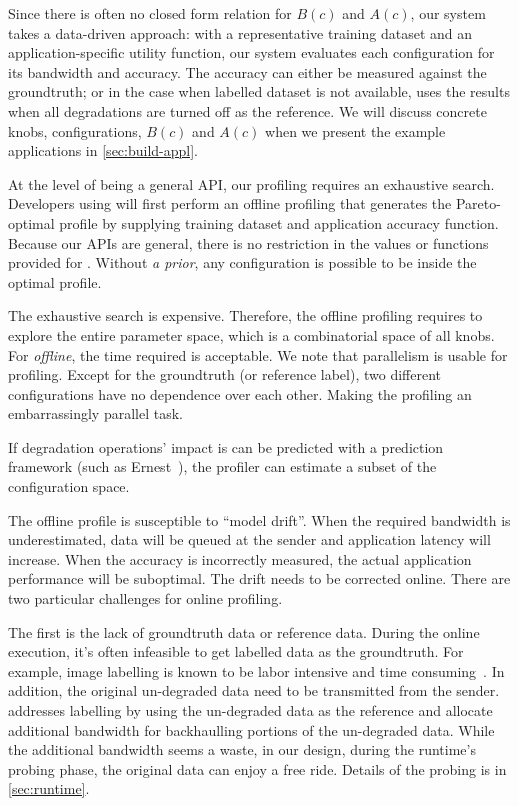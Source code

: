 Since there is often no closed form relation for $B(c)$ and $A(c)$, our system
takes a data-driven approach: with a representative training dataset and an
application-specific utility function, our system evaluates each configuration
for its bandwidth and accuracy. The accuracy can either be measured against the
groundtruth; or in the case when labelled dataset is not available, \sysname{}
uses the results when all degradations are turned off as the reference. We will
discuss concrete knobs, configurations, $B(c)$ and $A(c)$ when we present the
example applications in \autoref{sec:build-appl}.

 At the level of being a general API, our profiling
requires an exhaustive search. Developers using \sysname{} will first perform an
offline profiling that generates the Pareto-optimal profile by supplying
training dataset and application accuracy function. Because our APIs are
general, there is no restriction in the values or functions provided for
\maybe{}. Without \textit{a prior}, any configuration is possible to be inside
the optimal profile.

The exhaustive search is expensive. Therefore, the offline profiling requires to
explore the entire parameter space, which is a combinatorial space of all
knobs. For \textit{offline}, the time required is acceptable. We note that
parallelism is usable for profiling. Except for the groundtruth (or reference
label), two different configurations have no dependence over each other. Making
the profiling an embarrassingly parallel task.

If degradation operations' impact is can be predicted with a prediction
framework (such as Ernest~\cite{venkataraman2016ernest}), the profiler can
estimate a subset of the configuration space.

 The offline profile is susceptible to ``model
drift''. When the required bandwidth is underestimated, data will be queued at
the sender and application latency will increase. When the accuracy is
incorrectly measured, the actual application performance will be suboptimal. The
drift needs to be corrected online. There are two particular challenges for
online profiling.

The first is the lack of groundtruth data or reference data. During the online
execution, it's often infeasible to get labelled data as the groundtruth. For
example, image labelling is known to be labor intensive and time
consuming~\cite{russell2008labelme}. In addition, the original un-degraded data
need to be transmitted from the sender. \sysname{} addresses labelling by using
the un-degraded data as the reference and allocate additional bandwidth for
backhaulling portions of the un-degraded data. While the additional bandwidth
seems a waste, in our design, during the runtime's probing phase, the original
data can enjoy a free ride. Details of the probing is in \autoref{sec:runtime}.

